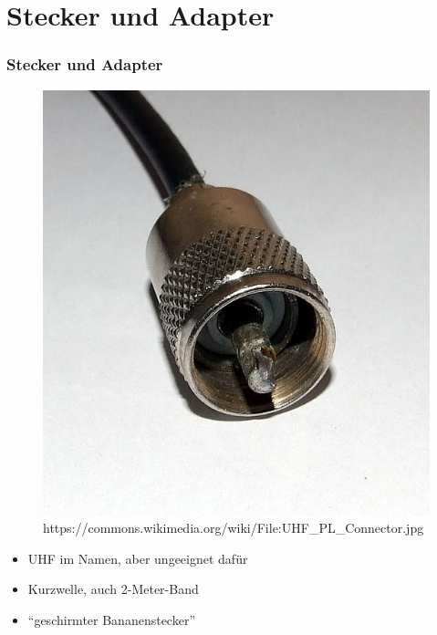 \section*{Stecker und Adapter}
\begin{frame}
  \frametitle{Stecker und Adapter}
  \begin{center}
    \begin{figure}
      \includegraphics[width=.6\textwidth,height=.55\textheight,keepaspectratio]{e10/pl.jpg}
                    {https://commons.wikimedia.org/wiki/File:UHF_PL_Connector.jpg}{\ccbysa}
    \end{figure}
    \begin{itemize}
      \item UHF im Namen, aber ungeeignet dafür
      \item Kurzwelle, auch 2-Meter-Band
      \item ``geschirmter Bananenstecker''
    \end{itemize}
  \end{center}
\end{frame}

